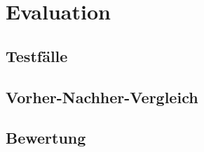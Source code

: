 \chapter{Evaluation}\label{ch:evaluation}


\section{Testfälle}


\section{Vorher-Nachher-Vergleich}


\section{Bewertung}
